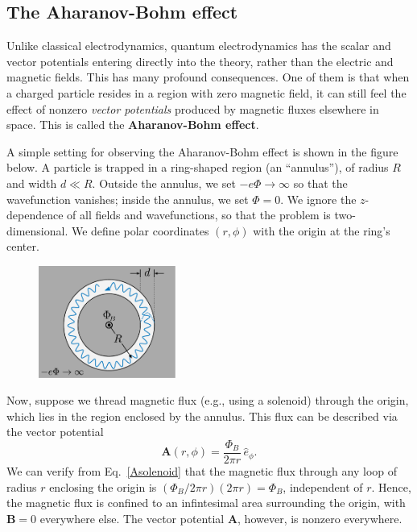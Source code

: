 \documentclass[pra,12pt]{revtex4}
\begin{document}
\subsection{The Aharanov-Bohm effect}

Unlike classical electrodynamics, quantum electrodynamics has the
scalar and vector potentials entering directly into the theory, rather
than the electric and magnetic fields.  This has many profound
consequences.  One of them is that when a charged particle resides in
a region with zero magnetic field, it can still feel the effect of
nonzero \textit{vector potentials} produced by magnetic fluxes
elsewhere in space.  This is called the \textbf{Aharanov-Bohm effect}.

A simple setting for observing the Aharanov-Bohm effect is shown in
the figure below.  A particle is trapped in a ring-shaped region (an
``annulus''), of radius $R$ and width $d \ll R$.  Outside the annulus,
we set $-e\Phi\rightarrow\infty$ so that the wavefunction vanishes;
inside the annulus, we set $\Phi = 0$.  We ignore the $z$-dependence
of all fields and wavefunctions, so that the problem is
two-dimensional.  We define polar coordinates $(r,\phi)$ with the
origin at the ring's center.

\begin{figure}[h]
  \centering\includegraphics[width=0.4\textwidth]{annulus}
\end{figure}

Now, suppose we thread magnetic flux (e.g., using a solenoid) through
the origin, which lies in the region enclosed by the annulus.  This
flux can be described via the vector potential
\begin{equation}
  \mathbf{A}(r,\phi) = \frac{\Phi_B}{2\pi r} \, \hat{e}_\phi.
  \label{Asolenoid}
\end{equation}
We can verify from Eq.~\eqref{Asolenoid} that the magnetic flux
through any loop of radius $r$ enclosing the origin is $(\Phi_B/2\pi
r)(2\pi r) = \Phi_B$, independent of $r$.  Hence, the magnetic flux is
confined to an infintesimal area surrounding the origin, with
$\mathbf{B} = 0$ everywhere else. The vector potential $\mathbf{A}$,
however, is nonzero everywhere.
\end{document}
